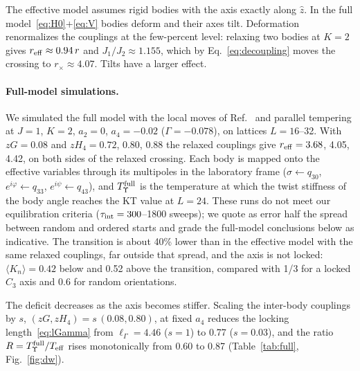 \documentclass[pre,reprint,superscriptaddress,longbibliography,amsmath,amssymb,floatfix]{revtex4-2}
\begin{document}
The effective model assumes rigid bodies with the axis exactly along $\hat z$. In the full model~\eqref{eq:H0}+\eqref{eq:V} bodies deform and their axes tilt. Deformation renormalizes the couplings at the few-percent level: relaxing two bodies at $K=2$ gives $r_{\rm eff}\approx0.94\,r$ and $J_1/J_2\approx1.155$, which by Eq.~\eqref{eq:decoupling} moves the crossing to $r_\times\approx4.07$. Tilts have a larger effect.

\paragraph*{Full-model simulations.} We simulated the full model with the local moves of Ref.~\cite{PaperI} and parallel tempering at $J=1$, $K=2$, $a_2=0$, $a_4=-0.02$ ($\Gamma=-0.078$), on lattices $L=16$--32. With $zG=0.08$ and $zH_4=0.72$, 0.80, 0.88 the relaxed couplings give $r_{\rm eff}=3.68$, 4.05, 4.42, on both sides of the relaxed crossing. Each body is mapped onto the effective variables through its multipoles in the laboratory frame ($\sigma\leftarrow q_{30}$, $e^{i\varphi}\leftarrow q_{33}$, $e^{i\psi}\leftarrow q_{43}$), and $T^{\rm full}_\Upsilon$ is the temperature at which the twist stiffness of the body angle reaches the KT value at $L=24$. These runs do not meet our equilibration criteria ($\tau_{\rm int}=300$--1800 sweeps); we quote as error half the spread between random and ordered starts and grade the full-model conclusions below as indicative. The transition is about 40\% lower than in the effective model with the same relaxed couplings, far outside that spread, and the axis is not locked: $\langle K_n\rangle=0.42$ below and 0.52 above the transition, compared with 1/3 for a locked $C_3$ axis and 0.6 for random orientations.

The deficit decreases as the axis becomes stiffer. Scaling the inter-body couplings by $s$, $(zG,zH_4)=s\,(0.08,0.80)$, at fixed $a_4$ reduces the locking length~\eqref{eq:lGamma} from $\ell_\Gamma=4.46$ ($s=1$) to 0.77 ($s=0.03$), and the ratio $R=T^{\rm full}_\Upsilon/T_{\rm eff}$ rises monotonically from 0.60 to 0.87 (Table~\ref{tab:full}, Fig.~\ref{fig:dw}).
\end{document}
